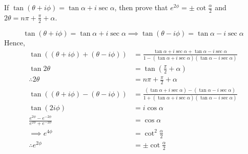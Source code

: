\begin{asign}
	If $\tan(\theta+i\phi)=\tan\alpha+i\sec\alpha$, then prove that $e^{2\phi}=\pm\cot\frac{\alpha}{2}$ and $2\theta=n\pi+\frac{\pi}{2}+\alpha$.
\end{asign}
\begin{anse}
	\[\tan(\theta+i\phi)=\tan\alpha+i\sec\alpha\implies\tan(\theta-i\phi)=\tan\alpha-i\sec\alpha\]
	Hence,
	\[\begin{split}
		\tan((\theta+i\phi)+(\theta-i\phi))&=\frac{\tan\alpha+i\sec\alpha+\tan\alpha-i\sec\alpha}{1-(\tan\alpha+i\sec\alpha)(\tan\alpha-i\sec\alpha)}\\
		\tan2\theta&=\tan(\frac{\pi}{2}+\alpha)\\
		\therefore 2\theta&=n\pi+\frac{\pi}{2}+\alpha
	\end{split}\]
	\[\begin{split}
		\tan((\theta+i\phi)-(\theta-i\phi))&=\frac{(\tan\alpha+i\sec\alpha)-(\tan\alpha-i\sec\alpha)}{1+(\tan\alpha+i\sec\alpha)(\tan\alpha-i\sec\alpha)} \\
		\tan(2i\phi)&=i\cos\alpha\\
		\frac{e^{2\phi}-e^{-2\phi}}{e^{2\phi}+e^{-2\phi}}&=\cos\alpha\\
		\implies e^{4\phi}&=\cot^2\frac{\alpha}{2}\\
		\therefore e^{2\phi}&=\pm \cot\frac{\alpha}{2}
	\end{split}\]
\end{anse}
